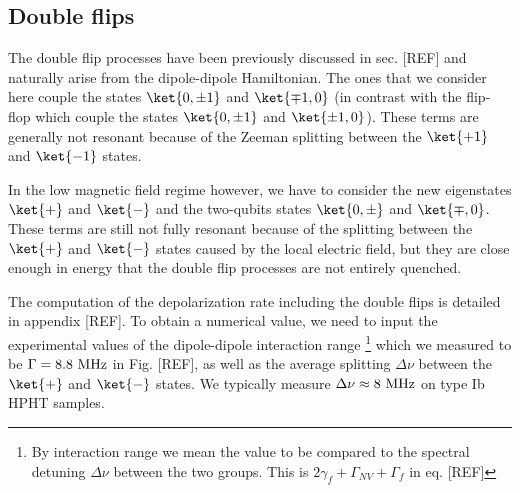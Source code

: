 \documentclass[a4paper,11pt]{report}
\begin{document}
%
%

\subsection{Double flips}

The double flip processes have been previously discussed in sec. [REF] and naturally arise from the dipole-dipole Hamiltonian. The ones that we consider here couple the states $\ket{0, \pm 1}$ and $\ket{\mp 1, 0}$ (in contrast with the flip-flop which couple the states $\ket{0, \pm 1}$ and $\ket{\pm 1, 0}$). These terms are generally not resonant because of the Zeeman splitting between the $\ket{+1}$ and $\ket{-1}$ states. 

In the low magnetic field regime however, we have to consider the new eigenstates $\ket{+}$ and $\ket{-}$ and the two-qubits states $\ket{0, \pm}$ and $\ket{\mp, 0}$. These terms are still not fully resonant because of the splitting between the $\ket{+}$ and $\ket{-}$ states caused by the local electric field, but they are close enough in energy that the double flip processes are not entirely quenched.

The computation of the depolarization rate including the double flips is detailed in appendix [REF]. To obtain a numerical value, we need to input the experimental values of the dipole-dipole interaction range \footnote{By interaction range we mean the value to be compared to the spectral detuning $\Delta \nu$ between the two groups. This is $2\gamma_f+\Gamma_{NV}+\Gamma_f$ in eq. [REF]} which we measured to be $\Gamma=8.8\ \rm MHz$ in Fig. [REF], as well as the average splitting $\Delta \nu$ between the $\ket{+}$ and $\ket{-}$ states. We typically measure $\Delta \nu \approx 8\ \rm MHz$ on type Ib HPHT samples.
\end{document}
